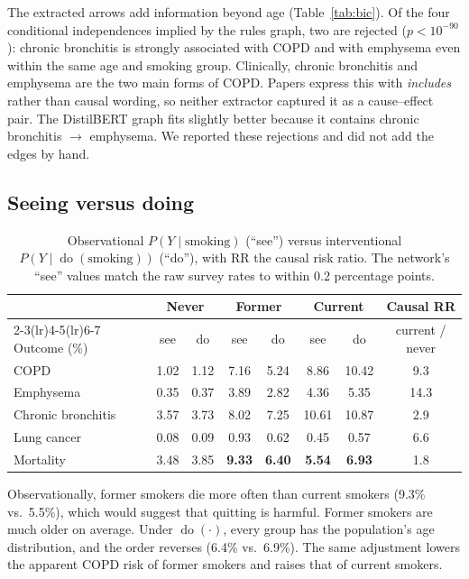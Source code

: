 \documentclass[11pt,a4paper]{article}
\newcommand{\doop}{\operatorname{do}}
\begin{document}
The extracted arrows add information beyond age (Table~\ref{tab:bic}). Of the four conditional independences implied by the rules
graph, two are rejected ($p < 10^{-90}$): chronic bronchitis is strongly associated with COPD and with emphysema even within the same
age and smoking group. Clinically, chronic bronchitis and emphysema are the two main forms of COPD. Papers express this with
\textit{includes} rather than causal wording, so neither extractor captured it as a cause--effect pair. The DistilBERT graph fits
slightly better because it contains chronic bronchitis $\rightarrow$ emphysema. We reported these rejections and did not add the edges by hand.

\subsection{Seeing versus doing}

\begin{table}[H]
\centering\small
\begin{tabular}{@{}lccccccc@{}}
\toprule
 & \multicolumn{2}{c}{Never} & \multicolumn{2}{c}{Former} & \multicolumn{2}{c}{Current} & Causal RR \\
\cmidrule(lr){2-3}\cmidrule(lr){4-5}\cmidrule(lr){6-7}
Outcome (\%) & see & do & see & do & see & do & current / never \\
\midrule
COPD & 1.02 & 1.12 & 7.16 & 5.24 & 8.86 & 10.42 & 9.3 \\
Emphysema & 0.35 & 0.37 & 3.89 & 2.82 & 4.36 & 5.35 & 14.3 \\
Chronic bronchitis & 3.57 & 3.73 & 8.02 & 7.25 & 10.61 & 10.87 & 2.9 \\
Lung cancer & 0.08 & 0.09 & 0.93 & 0.62 & 0.45 & 0.57 & 6.6 \\
Mortality & 3.48 & 3.85 & \textbf{9.33} & \textbf{6.40} & \textbf{5.54} & \textbf{6.93} & 1.8 \\
\bottomrule
\end{tabular}
\caption{Observational $P(Y \mid \text{smoking})$ (``see'') versus interventional $P(Y \mid \doop(\text{smoking}))$ (``do''), with RR the
causal risk ratio. The network's ``see'' values match the raw survey rates to within 0.2 percentage points.}
\label{tab:seedo}
\end{table}

Observationally, former smokers die more often than current smokers (9.3\% vs.\ 5.5\%), which would suggest that quitting is harmful.
Former smokers are much older on average. Under $\doop(\cdot)$, every group has the population's age distribution, and the order
reverses (6.4\% vs.\ 6.9\%). The same adjustment lowers the apparent COPD risk of former smokers and raises that of current smokers.
\end{document}

